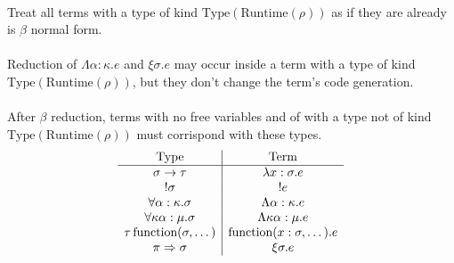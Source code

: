 \documentclass {article}
\begin{document}
\\
Treat all terms with a type of kind $ \text{Type} (\text{Runtime} (\rho)) $ as if they are already is $ \beta $ normal form. \\
\\
Reduction of $ \Lambda \alpha : \kappa. e $ and $ \xi \sigma. e $ may occur inside a term with a type of kind $ \text{Type} (\text{Runtime} (\rho)) $, but they don't
change the term's code generation. \\
\\
After $ \beta $ reduction, terms with no free variables and of with a type not of kind $ \text{Type} (\text{Runtime} (\rho) ) $ must corrispond with these types. \\
\begin{gather*}
\begin{array}{c | c}
\text{Type} & \text{Term} \\
\hline
\sigma \to \tau & \lambda x : \sigma. e \\
!\sigma & !e \\
\forall \alpha : \kappa. \sigma & \Lambda \alpha : \kappa. e  \\
\forall \kappa \alpha : \mu. \sigma & \Lambda \kappa \alpha : \mu. e \\
\tau \, \text{function} (\sigma, \dots) & \text{function}(x : \sigma, \dots). e \\
\pi \Rightarrow \sigma & \xi \sigma. e
\end{array}
\end{gather*}
\end{document}
